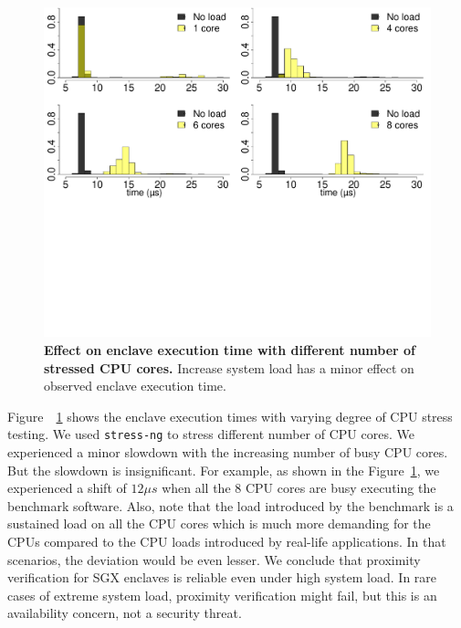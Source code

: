 \begin{figure}[t]
  \centering
    \includegraphics[trim={0 12cm 0 0}, clip, width=\linewidth]{data/CPU_stress/allCore_SGX_1.pdf}
    \caption{\textbf{Effect on enclave execution time with different number of stressed CPU cores.} Increase system load has a minor effect on observed enclave execution time.}
    \figsaver
    \label{graph:cpuLoad_SGX}
\end{figure}

 Figure~~\ref{graph:cpuLoad_SGX} shows the enclave execution times with varying degree of CPU stress testing. We used \texttt{stress-ng} to stress different number of CPU cores. We experienced a minor slowdown with the increasing number of busy CPU cores. But the slowdown is insignificant. For example, as shown in the Figure~\ref{graph:cpuLoad_SGX}, we experienced a shift of $12\mu s$ when all the 8 CPU cores are busy executing the benchmark software. Also, note that the load introduced by the benchmark is a sustained load on all the CPU cores which is much more demanding for the CPUs compared to the CPU loads introduced by real-life applications. In that scenarios, the deviation would be even lesser. We conclude that proximity verification for SGX enclaves is reliable even under high system load. In rare cases of extreme system load, proximity verification might fail, but this is an availability concern, not a security threat.









